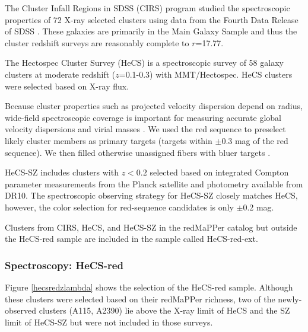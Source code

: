 The Cluster Infall Regions in SDSS (CIRS) program \citep{cirsi} studied the spectroscopic 
properties of 72 X-ray selected clusters
using data from the Fourth Data Release of SDSS \citep{dr4}.  
These galaxies are primarily in the Main Galaxy Sample and thus 
the cluster redshift surveys are
reasonably complete to $r$=17.77. %

The Hectospec Cluster Survey (HeCS) is a spectroscopic survey of 
58 galaxy clusters at moderate redshift ($z$=0.1-0.3)
with  MMT/Hectospec.  
HeCS clusters were selected based on X-ray flux. 

Because cluster properties such as 
projected velocity dispersion depend on radius, wide-field spectroscopic coverage is 
important for measuring accurate global velocity dispersions 
and virial masses \citep{biviano06}.
We used the red sequence to preselect likely
cluster members as primary targets  (targets within $\pm$0.3 mag of the red sequence).
We then filled otherwise unassigned fibers with bluer
targets \citep[][describes the details of target selection]{hecsultimate}.

HeCS-SZ includes clusters with $z<0.2$ selected based on integrated Compton parameter 
measurements from the Planck  satellite \citep{planckszcatalog} and photometry available from DR10. 
The spectroscopic observing strategy for HeCS-SZ closely matches HeCS, 
however, the color selection for red-sequence candidates is only $\pm$0.2 mag.  

Clusters from CIRS, HeCS, and HeCS-SZ in the redMaPPer catalog but outside 
the HeCS-red sample are included in the sample called HeCS-red-ext.

\subsubsection{Spectroscopy: HeCS-red}

Figure \ref{hecsredzlambda} shows the selection of the HeCS-red sample.
Although these clusters were selected based on their redMaPPer richness,
two of the newly-observed clusters (A115, A2390) %
lie above the X-ray limit of HeCS and the SZ limit of HeCS-SZ
but were not included in those surveys.

